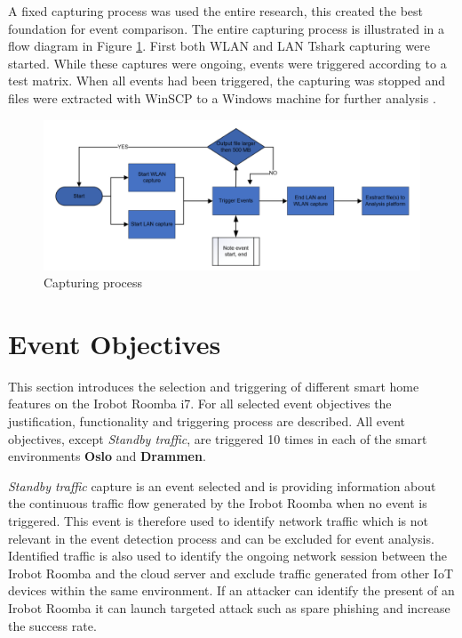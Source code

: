 A fixed capturing process was used the entire research, this created the best foundation for event comparison. The entire capturing process is illustrated in a flow diagram in Figure \ref{fig:captuingprocess}. First both WLAN and LAN Tshark capturing were started. While these captures were ongoing, events were triggered according to a test matrix. When all events had been triggered, the capturing was stopped and files were extracted with WinSCP to a Windows machine for further analysis \cite{winscp2023}.
  
\begin{figure}[H]
    \centering
    \includegraphics[width=\textwidth]{figures/Event triggering process.png}
    \caption{Capturing process}
    \label{fig:captuingprocess}
\end{figure}

\section{Event Objectives}

This section introduces the selection and triggering of different smart home features on the Irobot Roomba i7. For all selected event objectives the justification, functionality and triggering process are described. All event objectives, except \textit{Standby traffic}, are triggered 10 times in each of the smart environments \textbf{Oslo} and \textbf{Drammen}.

\textit{Standby traffic} capture is an event selected and is providing information about the continuous traffic flow generated by the Irobot Roomba when no event is triggered. This event is therefore used to identify network traffic which is not relevant in the event detection process and can be excluded for event analysis. Identified traffic is also used to identify the ongoing network session between the Irobot Roomba and the cloud server and exclude traffic generated from other IoT devices within the same environment. If an attacker can identify the present of an Irobot Roomba it can launch targeted attack such as spare phishing and increase the success rate. 

